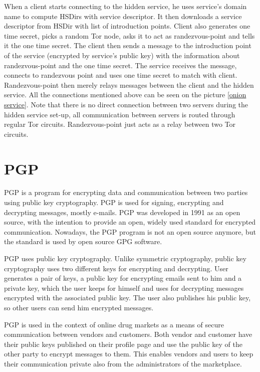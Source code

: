 \documentclass[
  digital, %
  table,   %
  lof,     %
  lot,     %
  oneside
]{fithesis3}
\begin{document}
When a client starts connecting to the hidden service, he uses service's domain name 
to compute HSDirs with service descriptor. It then downloads a service descriptor from HSDir with list
of introduction points. Client also generates one time secret, picks a random Tor node, asks
it to act as randezvous-point and tells it the one time secret. 
The client then sends a message to the introduction point of the service (encrypted by service's public key)
with the information about randezvous-point and the one time secret. The service receives the message, connects 
to randezvous point and uses one time secret to match with client.
Randezvous-point then merely relays messages between the client and the hidden service.
All the connections mentioned above can be seen on the picture \ref{onion service}.
Note that there is no direct connection between two servers during the hidden service set-up,
all communication between servers is routed through regular Tor circuits.
Randezvous-point just acts as a relay between two Tor circuits.

\section{PGP}

PGP \cite{Zimmermann:1995:OPU:202735} is a program for encrypting data
and communication between two parties using public key cryptography.
PGP is used for signing, encrypting and decrypting messages, mostly e-mails.
PGP was developed in 1991 as an open source, with the intention 
to provide an open, widely used standard for encrypted communication.
Nowadays, the PGP program is not an open source anymore, but the standard is used by open source GPG software.

PGP uses public key cryptography. Unlike symmetric cryptography, public key cryptography
uses two different keys for encrypting and decrypting.
User generates a pair of keys, a public key for encrypting emails sent to him and a private key, which the user
 keeps for himself and uses for decrypting messages encrypted with the associated public key.
 The user also publishes his public key, so other users can send him encrypted messages.

PGP is used in the context of online drug markets as a means of secure communication between vendors and customers.
Both vendor and customer have their public keys published on their profile page and use the public key of the other
party to encrypt messages to them. This enables vendors and users to keep their communication private also from the administrators of the marketplace.
\end{document}

